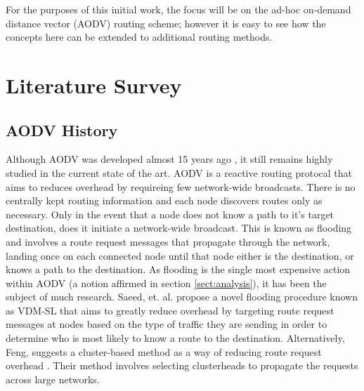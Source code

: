 \documentclass[conference]{IEEEtran}
\begin{document}
For the purposes of this initial work, the focus will be on the ad-hoc on-demand distance vector  (AODV) routing scheme; however it is easy to see how the concepts here can be extended to additional routing methods.

\section{Literature Survey}

\subsection{AODV History}

Although AODV was developed almost 15 years ago \cite{rfc3561}, it still remains highly studied in the current state of the art. AODV is a reactive routing protocal that aims to reduces overhead by requireing few network-wide broadcasts. There is no centrally kept routing information and each node discovers routes only as necessary. Only in the event that a node does not know a path to it's target destination, does it initiate a network-wide broadcast. This is known as flooding and involves a route request messages that propagate through the network, landing once on each connected node until that node either is the destination, or knows a path to the destination. As flooding is the single most expensive action within AODV (a notion affirmed in section \ref{sect:analysis}), it has been the subject of much research. Saeed, et. al. \cite{7813246} propose a novel flooding procedure known as VDM-SL that aims to greatly reduce overhead by targeting route request messages at nodes based on the type of traffic they are sending in order to determine who is most likely to know a route to the destination. Alternatively, Feng, suggests a cluster-based method as a way of reducing route request overhead \cite{8343729}. Their method involves selecting clusterheads to propagate the requests across large networks.
\end{document}
